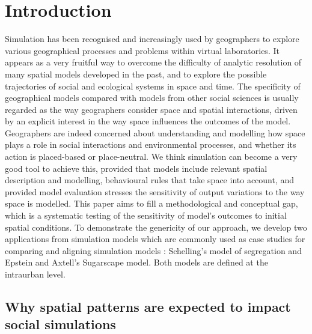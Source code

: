 \documentclass[Afour,sageh,times]{sagej}
\begin{document}

\maketitle




\section{Introduction}

Simulation has been recognised and increasingly used by geographers to explore various geographical processes and problems within virtual laboratories. It appears as a very fruitful way to overcome the difficulty of analytic resolution of many spatial models developed in the past, and to explore the possible trajectories of social and ecological systems in space and time. The specificity of geographical models compared with models from other social sciences is usually regarded as the way geographers consider space and spatial interactions, driven by an explicit interest in the way space influences the outcomes of the model. Geographers are indeed concerned about understanding and modelling how space plays a role in social interactions and environmental processes, and whether its action is placed-based or place-neutral. We think simulation can become a very good tool to achieve this, provided that models include relevant spatial description and modelling, behavioural rules that take space into account, and provided model evaluation stresses the sensitivity of output variations to the way space is modelled. This paper aims to fill a methodological and conceptual gap, which is a systematic testing of the sensitivity of model's outcomes to initial spatial conditions. To demonstrate the genericity of our approach, we develop two applications from simulation models which are commonly used as case studies for comparing and aligning simulation models \citep{Axtelletal1996}: Schelling's model of segregation and Epstein and Axtell's Sugarscape model. Both models are defined at the intraurban level.


\subsection{Why spatial patterns are expected to impact social simulations}
\end{document}
